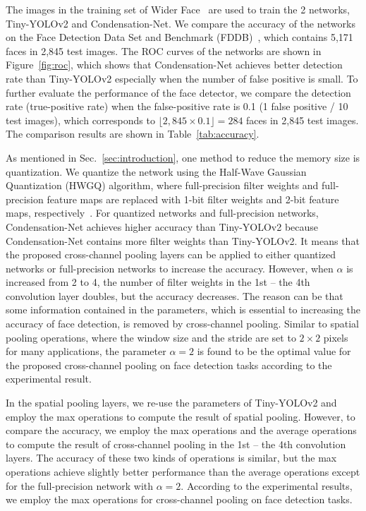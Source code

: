 \documentclass[10pt,twocolumn,letterpaper]{article}
\begin{document}
The images in the training set of Wider Face~\cite{Yang16} are used to train the 2 networks, Tiny-YOLOv2 and Condensation-Net. We compare the accuracy of the networks on the Face Detection Data Set and Benchmark (FDDB)~\cite{Jain10}, which contains 5,171 faces in 2,845 test images. The ROC curves of the networks are shown in Figure~\ref{fig:roc}, which shows that Condensation-Net achieves better detection rate than Tiny-YOLOv2 especially when the number of false positive is small. To further evaluate the performance of the face detector, we compare the detection rate (true-positive rate) when the false-positive rate is 0.1 (1 false positive / 10 test images), which corresponds to $\lfloor 2,845 \times 0.1 \rfloor = 284$ faces in 2,845 test images. The comparison results are shown in Table~\ref{tab:accuracy}. 

As mentioned in Sec.~\ref{sec:introduction}, one method to reduce the memory size is quantization. We quantize the network using the Half-Wave Gaussian Quantization (HWGQ) algorithm, where full-precision filter weights and full-precision feature maps are replaced with 1-bit filter weights and 2-bit feature maps, respectively~\cite{Cai17}. For quantized networks and full-precision networks, Condensation-Net achieves higher accuracy than Tiny-YOLOv2 because Condensation-Net contains more filter weights than Tiny-YOLOv2. It means that the proposed cross-channel pooling layers can be applied to either quantized networks or full-precision networks to increase the accuracy. However, when $\alpha$ is increased from 2 to 4, the number of filter weights in the 1st -- the 4th convolution layer doubles, but the accuracy decreases. The reason can be that some information contained in the parameters, which is essential to increasing the accuracy of face detection, is removed by cross-channel pooling. Similar to spatial pooling operations, where the window size and the stride are set to $2 \times 2$ pixels for many applications, the parameter $\alpha = 2$ is found to be the optimal value for the proposed cross-channel pooling on face detection tasks according to the experimental result.

In the spatial pooling layers, we re-use the parameters of Tiny-YOLOv2 and employ the max operations to compute the result of spatial pooling. However, to compare the accuracy, we employ the max operations and the average operations to compute the result of cross-channel pooling in the 1st -- the 4th convolution layers. The accuracy of these two kinds of operations is similar, but the max operations achieve slightly better performance than the average operations except for the full-precision network with $\alpha = 2$. According to the experimental results, we employ the max operations for cross-channel pooling on face detection tasks.
\end{document}
